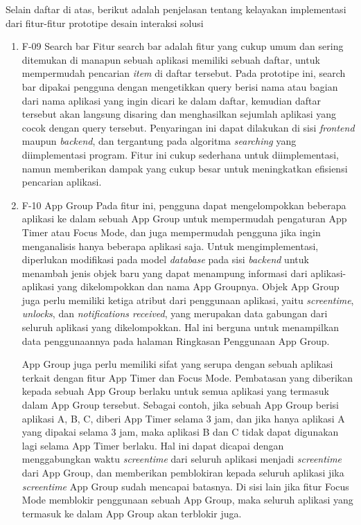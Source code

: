 Selain daftar di atas, berikut adalah penjelasan tentang kelayakan implementasi dari fitur-fitur prototipe desain interaksi solusi

\begin{enumerate}
  \item F-09 Search bar
  \subitem Fitur search bar adalah fitur yang cukup umum dan sering ditemukan di manapun sebuah aplikasi memiliki sebuah daftar, untuk mempermudah pencarian \textit{item} di daftar tersebut. Pada prototipe ini, search bar dipakai pengguna dengan mengetikkan query berisi nama atau bagian dari nama aplikasi yang ingin dicari ke dalam daftar, kemudian daftar tersebut akan langsung disaring dan menghasilkan sejumlah aplikasi yang cocok dengan query tersebut. Penyaringan ini dapat dilakukan di sisi \textit{frontend} maupun \textit{backend}, dan tergantung pada algoritma \textit{searching} yang diimplementasi program. Fitur ini cukup sederhana untuk diimplementasi, namun memberikan dampak yang cukup besar untuk meningkatkan efisiensi pencarian aplikasi. 
    
  \item F-10 App Group
  \subitem Pada fitur ini, pengguna dapat mengelompokkan beberapa aplikasi ke dalam sebuah App Group untuk mempermudah pengaturan App Timer atau Focus Mode, dan juga mempermudah pengguna jika ingin menganalisis hanya beberapa aplikasi saja. Untuk mengimplementasi, diperlukan modifikasi pada model \textit{database} pada sisi \textit{backend} untuk menambah jenis objek baru yang dapat menampung informasi dari aplikasi-aplikasi yang dikelompokkan dan nama App Groupnya. Objek App Group juga perlu memiliki ketiga atribut dari penggunaan aplikasi, yaitu \textit{screentime}, \textit{unlocks}, dan \textit{notifications received}, yang merupakan data gabungan dari seluruh aplikasi yang dikelompokkan. Hal ini berguna untuk menampilkan data penggunaannya pada halaman Ringkasan Penggunaan App Group.

  App Group juga perlu memiliki sifat yang serupa dengan sebuah aplikasi terkait dengan fitur App Timer dan Focus Mode. Pembatasan yang diberikan kepada sebuah App Group berlaku untuk semua aplikasi yang termasuk dalam App Group tersebut. Sebagai contoh, jika sebuah App Group berisi aplikasi A, B, C, diberi App Timer selama 3 jam, dan jika hanya aplikasi A yang dipakai selama 3 jam, maka aplikasi B dan C tidak dapat digunakan lagi selama App Timer berlaku. Hal ini dapat dicapai dengan menggabungkan waktu \textit{screentime} dari seluruh aplikasi menjadi \textit{screentime} dari App Group, dan memberikan pemblokiran kepada seluruh aplikasi jika \textit{screentime} App Group sudah mencapai batasnya. Di sisi lain jika fitur Focus Mode memblokir penggunaan sebuah App Group, maka seluruh aplikasi yang termasuk ke dalam App Group akan terblokir juga.   
    

\end{enumerate}
